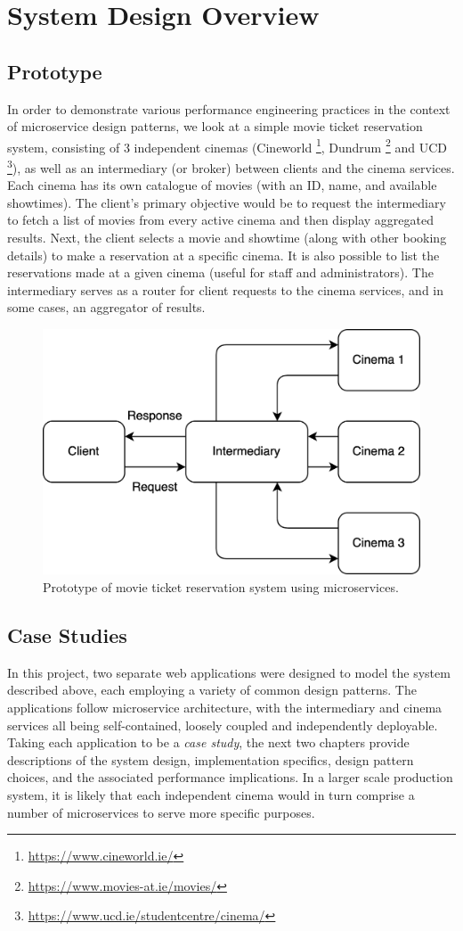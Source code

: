 \chapter{System Design Overview}

\section{Prototype}

In order to demonstrate various performance engineering practices in the context of microservice design patterns, we look at a simple movie ticket reservation system, consisting of 3 independent cinemas (Cineworld \footnote{\url{https://www.cineworld.ie/}}, Dundrum \footnote{\url{https://www.movies-at.ie/movies/}} and UCD \footnote{\url{https://www.ucd.ie/studentcentre/cinema/}}), as well as an intermediary (or broker) between clients and the cinema services. Each cinema has its own catalogue of movies (with an ID, name, and available showtimes). The client's primary objective would be to request the intermediary to fetch a list of movies from every active cinema and then display aggregated results. Next, the client selects a movie and showtime (along with other booking details) to make a reservation at a specific cinema. It is also possible to list the reservations made at a given cinema (useful for staff and administrators). The intermediary serves as a router for client requests to the cinema services, and in some cases, an aggregator of results.


\begin{figure}[H]
  \centering
  \includegraphics[width=0.5\linewidth]{./assets/diagrams/outline-arch.png}
  \caption{Prototype of movie ticket reservation system using microservices.}
  \label{fig:outline-arch}
\end{figure}

\section{Case Studies}

In this project, two separate web applications were designed to model the system described above, each employing a variety of common design patterns. The applications follow microservice architecture, with the intermediary and cinema services all being self-contained, loosely coupled and independently deployable. Taking each application to be a \textit{case study}, the next two chapters provide descriptions of the system design, implementation specifics, design pattern choices, and the associated performance implications. In a larger scale production system, it is likely that each independent cinema would in turn comprise a number of microservices to serve more specific purposes.

